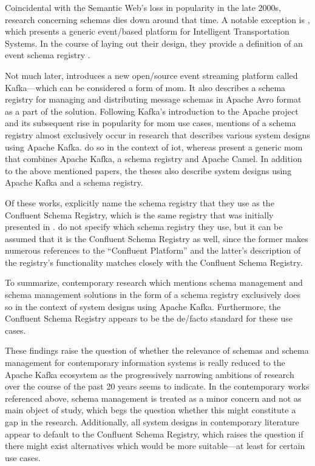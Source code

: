 Coincidental with the Semantic Web's loss in popularity in the late 2000s, research concerning schemas dies down around that time.
A notable exception is \cite{ma_iip_2010}, which presents a generic event\-/based platform for Intelligent Transportation Systems.
In the course of laying out their design, they provide a definition of an event schema registry \parencite[see][p.~3]{ma_iip_2010}.

Not much later, \cite{kreps_kafka_2011} introduces a new open\-/source event streaming platform called Kafka---which can be considered a form of \gls{mom}. It also describes a schema registry for managing and distributing message schemas in Apache Avro format as a part of the solution.
Following Kafka's introduction to the Apache project and its subsequent rise in popularity for \gls{mom} use cases, mentions of a schema registry almost exclusively occur in research that describes various system designs using Apache Kafka.
\cites{muller_iot_2017}{radchenko_micro-workflows_2018}{ranjan_radar-base_2019} do so in the context of \gls{iot}, whereas \cite{g_b_high_2021} present a generic \gls{mom} that combines Apache Kafka, a schema registry and Apache Camel.
In addition to the above mentioned papers, the theses \cites{dessalegn_muruts_multi-tenant_2016}{auer_distributed_2017}{korhonen_using_2019} also describe system designs using Apache Kafka and a schema registry.

Of these works, \cites{muller_iot_2017}{radchenko_micro-workflows_2018}{dessalegn_muruts_multi-tenant_2016}{auer_distributed_2017}{korhonen_using_2019} explicitly name the schema registry that they use as the Confluent Schema Registry, which is the same registry that was initially presented in \cite{kreps_kafka_2011}.
\cites{ranjan_radar-base_2019}{g_b_high_2021} do not specify which schema registry they use, but it can be assumed that it is the Confluent Schema Registry as well, since the former makes numerous references to the \enquote{Confluent Platform} and the latter's description of the registry's functionality matches closely with the Confluent Schema Registry.

To summarize, contemporary research which mentions schema management and schema management solutions in the form of a schema registry exclusively does so in the context of system designs using Apache Kafka.
Furthermore, the Confluent Schema Registry appears to be the de\-/facto standard for these use cases.

These findings raise the question of whether the relevance of schemas and schema management for contemporary information systems is really reduced to the Apache Kafka ecosystem as the progressively narrowing ambitions of research over the course of the past 20 years seems to indicate.
In the contemporary works referenced above, schema management is treated as a minor concern and not as main object of study, which begs the question whether this might constitute a gap in the research.
Additionally, all system designs in contemporary literature appear to default to the Confluent Schema Registry, which raises the question if there might exist alternatives which would be more suitable---at least for certain use cases.
